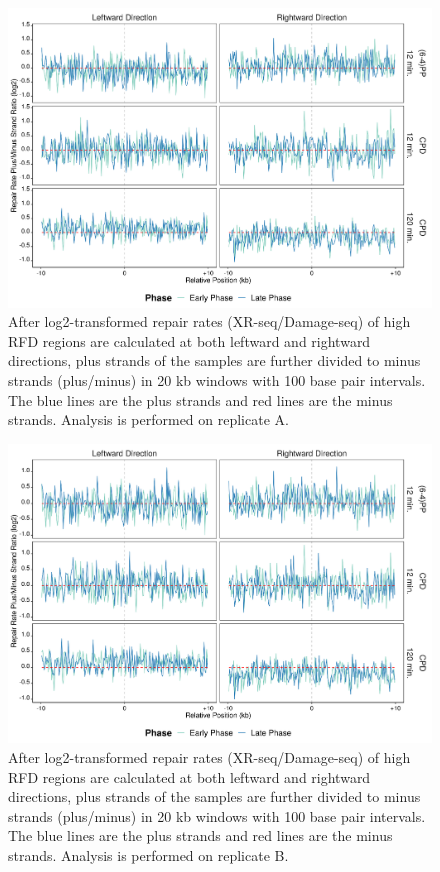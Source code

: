 \begin{figure}[H]
\begin{center}
\includegraphics[width=\textwidth]{Chapters/7_appendix/figures/supfig74}
\caption[Repair rate plus/minus ratio of high RFDs in 20 kb (replicate A).]{After log2-transformed repair rates (XR-seq/Damage-seq) of high RFD regions are calculated at both leftward and rightward directions, plus strands of the samples are further divided to minus strands (plus/minus) in 20 kb windows with 100 base pair intervals. The blue lines are the plus strands and red lines are the minus strands. Analysis is performed on replicate A.}
\label{supfig:rrpm20rfdA}
\end{center}
\end{figure}

\begin{figure}[H]
\begin{center}
\includegraphics[width=\textwidth]{Chapters/7_appendix/figures/supfig75}
\caption[Repair rate plus/minus ratio of high RFDs in 20 kb (replicate B).]{After log2-transformed repair rates (XR-seq/Damage-seq) of high RFD regions are calculated at both leftward and rightward directions, plus strands of the samples are further divided to minus strands (plus/minus) in 20 kb windows with 100 base pair intervals. The blue lines are the plus strands and red lines are the minus strands. Analysis is performed on replicate B.}
\label{supfig:rrpm20rfdB}
\end{center}
\end{figure}

